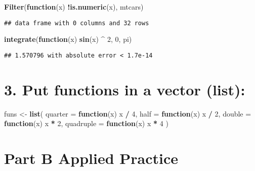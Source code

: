 \documentclass[
]{article}
\newenvironment{Shaded}{\begin{snugshade}}{\end{snugshade}}
\newcommand{\ControlFlowTok}[1]{\textcolor[rgb]{0.13,0.29,0.53}{\textbf{#1}}}
\newcommand{\DataTypeTok}[1]{\textcolor[rgb]{0.13,0.29,0.53}{#1}}
\newcommand{\DecValTok}[1]{\textcolor[rgb]{0.00,0.00,0.81}{#1}}
\newcommand{\KeywordTok}[1]{\textcolor[rgb]{0.13,0.29,0.53}{\textbf{#1}}}
\newcommand{\NormalTok}[1]{#1}
\newcommand{\OperatorTok}[1]{\textcolor[rgb]{0.81,0.36,0.00}{\textbf{#1}}}
\newcommand{\StringTok}[1]{\textcolor[rgb]{0.31,0.60,0.02}{#1}}
\begin{document}
\begin{Shaded}
\begin{Highlighting}[]
\KeywordTok{Filter}\NormalTok{(}\ControlFlowTok{function}\NormalTok{(x) }\OperatorTok{!}\KeywordTok{is.numeric}\NormalTok{(x), mtcars)}
\end{Highlighting}
\end{Shaded}

\begin{verbatim}
## data frame with 0 columns and 32 rows
\end{verbatim}

\begin{Shaded}
\begin{Highlighting}[]
\KeywordTok{integrate}\NormalTok{(}\ControlFlowTok{function}\NormalTok{(x) }\KeywordTok{sin}\NormalTok{(x) }\OperatorTok{^}\StringTok{ }\DecValTok{2}\NormalTok{, }\DecValTok{0}\NormalTok{, pi)}
\end{Highlighting}
\end{Shaded}

\begin{verbatim}
## 1.570796 with absolute error < 1.7e-14
\end{verbatim}

\hypertarget{put-functions-in-a-vector-list}{%
\section{3. Put functions in a vector
(list):}\label{put-functions-in-a-vector-list}}

\begin{Shaded}
\begin{Highlighting}[]
\NormalTok{funs <-}\StringTok{ }\KeywordTok{list}\NormalTok{(}
  \DataTypeTok{quarter =} \ControlFlowTok{function}\NormalTok{(x) x }\OperatorTok{/}\StringTok{ }\DecValTok{4}\NormalTok{,}
  \DataTypeTok{half =} \ControlFlowTok{function}\NormalTok{(x) x }\OperatorTok{/}\StringTok{ }\DecValTok{2}\NormalTok{,}
  \DataTypeTok{double =} \ControlFlowTok{function}\NormalTok{(x) x }\OperatorTok{*}\StringTok{ }\DecValTok{2}\NormalTok{,}
  \DataTypeTok{quadruple =} \ControlFlowTok{function}\NormalTok{(x) x }\OperatorTok{*}\StringTok{ }\DecValTok{4}
\NormalTok{)}
\end{Highlighting}
\end{Shaded}

\hypertarget{part-b-applied-practice}{%
\section{Part B Applied Practice}\label{part-b-applied-practice}}
\end{document}
